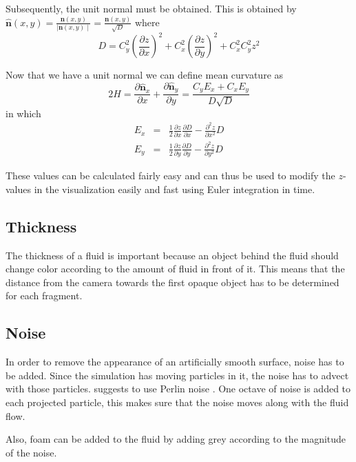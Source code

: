 Subsequently, the unit normal must be obtained. This is obtained by \(\hat{\mathbf{n}}(x,y) = \frac{\mathbf{n}(x,y)}{\mid \mathbf{n}(x,y)\mid} = \frac{\mathbf{n}(x,y)}{\sqrt{D}}\) where 
\begin{equation}
	\label{eq:D}
	D = C_y^2 \left(\frac{\partial z}{\partial x}\right)^2 + C_x^2 \left(\frac{\partial z}{\partial y}\right)^2 + C_x^2 C_y^2 z^2
\end{equation}

Now that we have a unit normal we can define mean curvature as 
\begin{equation}
	\label{eq:curvy}
	2H = \frac{\partial \hat{\mathbf{n}}_x}{\partial x} + \frac{\partial\hat{\mathbf{n}}_y}{\partial y} = \frac{C_y E_x + C_x E_y}{D\sqrt{D}}
\end{equation}
in which
\begin{eqnarray}
	E_x &=& \frac{1}{2}\frac{\partial z}{\partial x}\frac{\partial D}{\partial x} - \frac{\partial^2z}{\partial x^2}D\\
	E_y &=& \frac{1}{2}\frac{\partial z}{\partial y}\frac{\partial D}{\partial y} - \frac{\partial^2z}{\partial y^2}D
\end{eqnarray}

These values can be calculated fairly easy and can thus be used to modify the \(z\)-values in the visualization easily and fast using Euler integration in time.

\subsection{Thickness}
The thickness of a fluid is important because an object behind the fluid should change color according to the amount of fluid in front of it.
This means that the distance from the camera towards the first opaque object has to be determined for each fragment.

\subsection{Noise}
In order to remove the appearance of an artificially smooth surface, noise has to be added.
Since the simulation has moving particles in it, the noise has to advect with those particles.
\cite{van2009screen} suggests to use Perlin noise \cite{perlin1985image}.
One octave of noise is added to each projected particle, this makes sure that the noise moves along with the fluid flow.

Also, foam can be added to the fluid by adding grey according to the magnitude of the noise.

